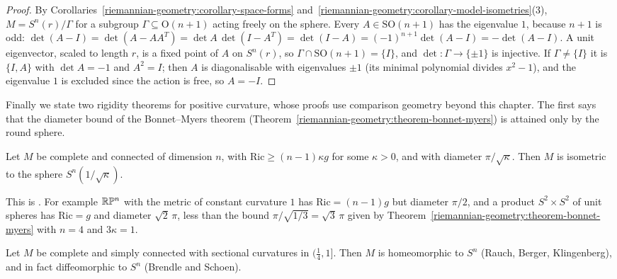 \begin{proof}
By Corollaries~\ref{riemannian-geometry:corollary-space-forms} and~\ref{riemannian-geometry:corollary-model-isometries}(3), $M = S^n(r)/\Gamma$ for a subgroup
$\Gamma \subseteq \mathrm{O}(n + 1)$ acting freely on the sphere. Every $A \in \mathrm{SO}(n + 1)$ has the eigenvalue $1$, because $n + 1$ is odd:
$\det(A - I) = \det(A - AA^T) = \det A\,\det(I - A^T) = \det(I - A) = (-1)^{n+1}\det(A - I) = -\det(A - I)$. A unit eigenvector, scaled to length $r$, is a fixed point of
$A$ on $S^n(r)$, so $\Gamma \cap \mathrm{SO}(n + 1) = \{I\}$, and $\det \colon \Gamma \to \{\pm1\}$ is injective. If $\Gamma \neq \{I\}$ it is $\{I, A\}$ with
$\det A = -1$ and $A^2 = I$; then $A$ is diagonalisable with eigenvalues $\pm1$ (its minimal polynomial divides $x^2 - 1$), and the eigenvalue $1$ is excluded since the
action is free, so $A = -I$.
\end{proof}

Finally we state two rigidity theorems for positive curvature, whose proofs use comparison geometry beyond this chapter. The first says that the diameter bound of
the Bonnet--Myers theorem (Theorem~\ref{riemannian-geometry:theorem-bonnet-myers}) is attained only by the round sphere.

\begin{theorem}\label{riemannian-geometry:theorem-maximal-diameter}
Let $M$ be complete and connected of dimension $n$, with $\mathrm{Ric} \geq (n - 1)\kappa g$ for some $\kappa > 0$, and with diameter $\pi/\sqrt\kappa$. Then $M$ is
isometric to the sphere $S^n(1/\sqrt\kappa)$.
\end{theorem}

This is \cite{cheng-1975}. For example $\mathbb{R}\mathbb{P}^n$ with the metric of constant curvature $1$ has $\mathrm{Ric} = (n - 1)g$ but diameter $\pi/2$, and a product
$S^2 \times S^2$ of unit spheres has $\mathrm{Ric} = g$ and diameter $\sqrt2\,\pi$, less than the bound $\pi/\sqrt{1/3} = \sqrt3\,\pi$ given by
Theorem~\ref{riemannian-geometry:theorem-bonnet-myers} with $n = 4$ and $3\kappa = 1$.

\begin{theorem}\label{riemannian-geometry:theorem-sphere}
Let $M$ be complete and simply connected with sectional curvatures in $(\frac14, 1]$. Then $M$ is homeomorphic to $S^n$ (Rauch, Berger, Klingenberg), and in fact
diffeomorphic to $S^n$ (Brendle and Schoen).
\end{theorem}


